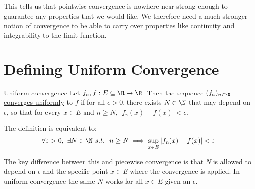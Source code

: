 \documentclass[../Main.tex]{subfiles}
\begin{document}
This tells us that pointwise convergence is nowhere near strong enough to guarantee any properties that we would like. We therefore need a much stronger notion of convergence to be able to carry over properties like continuity and integrability to the limit function.
\section{Defining Uniform Convergence}
\begin{definition}{Uniform convergence}
    Let $f_n, f : E \subseteq \R \mapsto \R$. Then the sequence $(f_n)_{n \in \N}$ \underline{converges uniformly} to $f$ if for all $\epsilon > 0$, there exists $N \in \N$ that may depend on $\epsilon$, so that for every $x \in E$ and $n \geq N$, $|f_n(x) - f(x)| < \epsilon$.
\end{definition}
\begin{remark}
    The definition is equivalent to:
    \begin{equation*}
        \forall \epsilon > 0,~ \exists N \in \N~s.t.~~n \geq N \implies \sup_{x \in E} |f_n(x) - f(x)| < \epsilon
    \end{equation*}
\end{remark}
The key difference between this and piecewise convergence is that $N$ is allowed to depend on $\epsilon$ and the specific point $x \in E$ where the convergence is applied. In uniform convergence the same $N$ works for all $x \in E$ given an $\epsilon$.
\end{document}
